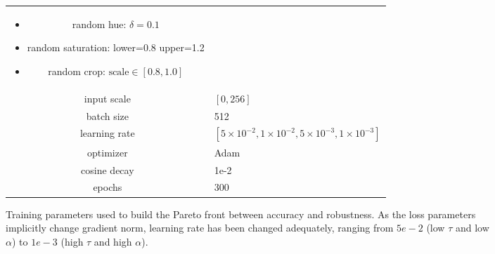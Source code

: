 \begin{figure}
\begin{subfigure}[b]{0.6\textwidth}
\begin{tabular}{cp{5.5cm}}
\begin{itemize}[leftmargin=*]
                        \item random hue: $\delta=0.1$
                        \item random saturation: lower=0.8 upper=1.2
                        \item random crop: $\text{scale}\in[0.8, 1.0]$
                    \end{itemize} \\
                    input scale & $[0,256]$ \\
                    batch size & 512 \\
                    learning rate & $[5\times10^{-2}, 1\times10^{-2}, 5\times10^{-3}, 1\times10^{-3}]$ \\
                    optimizer & Adam \\
                    cosine decay & 1e-2 \\
                    epochs &  300 \\
                    \hline
                \end{tabular}
                \caption{Training parameters used to build the Pareto front between accuracy and robustness. As the loss parameters implicitly change gradient norm, learning rate has been changed adequately, ranging from $5e-2$ (low $\tau$ and low $\alpha$) to $1e-3$ (high $\tau$ and high $\alpha$).}
                \label{fig:pareto-lp}
            \end{subfigure}
            \caption{}
    \end{figure}

